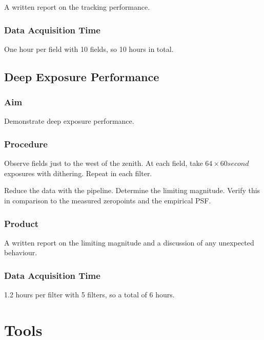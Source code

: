 \documentclass{article}
\begin{document}
A written report on the tracking performance.

\subsubsection{Data Acquisition Time}

One hour per field with 10 fields, so 10 hours in total.


\subsection{Deep Exposure Performance}

\subsubsection{Aim}

Demonstrate deep exposure performance.

\subsubsection{Procedure}

Observe fields just to the west of the zenith. At each field, take $64 \times 60 second$ exposures with dithering. Repeat in each filter.

Reduce the data with the pipeline. Determine the limiting magnitude. Verify this in comparison to the measured zeropoints and the empirical PSF.

\subsubsection{Product}

A written report on the limiting magnitude and a discussion of any unexpected behaviour.

\subsubsection{Data Acquisition Time}

1.2 hours per filter with 5 filters, so a total of 6 hours.


\section{Tools}
\label{section:tools}
\end{document}
